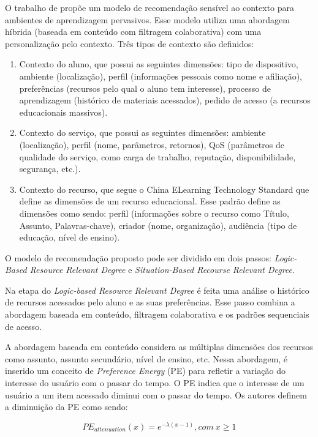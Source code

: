 O trabalho de  propõe um modelo de recomendação sensível ao contexto para ambientes de
aprendizagem pervasivos. Esse modelo utiliza uma abordagem híbrida (baseada em conteúdo com filtragem colaborativa)
com uma personalização pelo contexto. Três tipos de contexto são definidos:

\begin{enumerate}
\item Contexto do aluno, que possui as seguintes dimensões: tipo de dispositivo, ambiente (localização), perfil
(informações pessoais como nome e afiliação), preferências (recursos pelo qual o aluno tem interesse), processo de
aprendizagem (histórico de materiais acessados), pedido de acesso (a recursos educacionais massivos).
\item Contexto do serviço, que possui as seguintes dimensões: ambiente (localização), perfil (nome, parâmetros,
retornos), QoS (parâmetros de qualidade do serviço, como carga de trabalho, reputação, disponibilidade, segurança, etc.).
\item Contexto do recurso, que segue o China ELearning Technology Standard que define as dimensões de um recurso
educacional. Esse padrão define as dimensões como sendo: perfil (informações sobre o recurso como Título, Assunto,
Palavras-chave), criador (nome, organização), audiência (tipo de educação, nível de ensino).
\end{enumerate}

O modelo de recomendação proposto pode ser dividido em dois passos: \textit{Logic-Based Resource Relevant Degree} e
\textit{Situation-Based Recourse Relevant Degree}.

Na etapa do \textit{Logic-based Resource Relevant Degree} é feita uma análise o histórico de recursos acessados pelo aluno e as
suas preferências. Esse passo combina a abordagem baseada em conteúdo, filtragem colaborativa e os padrões sequenciais
de acesso.

A abordagem baseada em conteúdo considera as múltiplas dimensões dos recursos como assunto, assunto secundário, nível
de ensino, etc. Nessa abordagem, é inserido um conceito de \textit{Preference Energy} (PE) para refletir a variação do interesse
do usuário com o passar do tempo. O PE indica que o interesse de um usuário a um item acessado diminui com o passar do
tempo. Os autores definem a diminuição da PE como sendo:

\begin{equation}
  PE_{attenuation}(x) = e^{- \lambda (x-1)}, com \ x \geqslant 1
  \label{eq:luo-preference-energy}
\end{equation}

